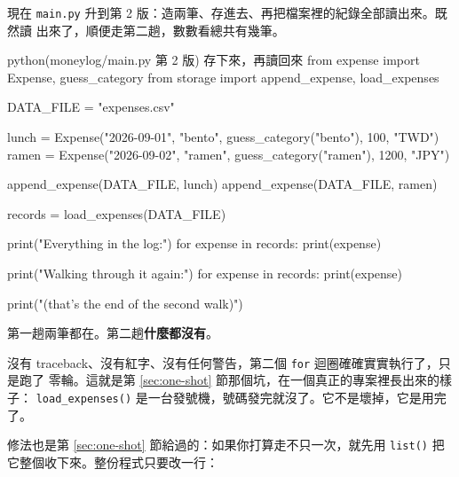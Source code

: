 
現在 \texttt{main.py} 升到第 2 版：造兩筆、存進去、再把檔案裡的紀錄全部讀出來。既然讀
出來了，順便走第二趟，數數看總共有幾筆。

\begin{example}{python}{(moneylog/main.py 第 2 版) 存下來，再讀回來}
from expense import Expense, guess_category
from storage import append_expense, load_expenses

DATA_FILE = "expenses.csv"

lunch = Expense("2026-09-01", "bento", guess_category("bento"), 100, "TWD")
ramen = Expense("2026-09-02", "ramen", guess_category("ramen"), 1200, "JPY")

append_expense(DATA_FILE, lunch)
append_expense(DATA_FILE, ramen)

records = load_expenses(DATA_FILE)

print("Everything in the log:")
for expense in records:
    print(expense)

print("Walking through it again:")
for expense in records:
    print(expense)

print("(that's the end of the second walk)")
\end{example}


第一趟兩筆都在。第二趟\textbf{什麼都沒有}。

沒有 traceback、沒有紅字、沒有任何警告，第二個 \texttt{for} 迴圈確確實實執行了，只是跑了
零輪。這就是第 \ref{sec:one-shot} 節那個坑，在一個真正的專案裡長出來的樣子：
\texttt{load\_expenses()} 是一台發號機，號碼發完就沒了。它不是壞掉，它是用完了。

修法也是第 \ref{sec:one-shot} 節給過的：如果你打算走不只一次，就先用
\texttt{list()} 把它整個收下來。整份程式只要改一行：

